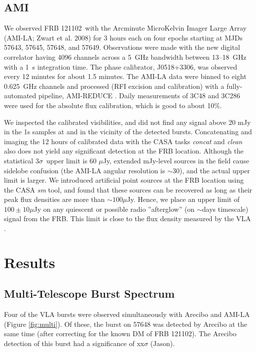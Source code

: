 \documentclass[twocolumn]{aastex61}
\newcommand{\frb}{FRB 121102}
\begin{document}
\subsection{AMI}

We observed \frb\ with the Arcminute MicroKelvin Imager Large Array (AMI-LA; Zwart et al. 2008) for 3 hours each on four epochs starting at MJDs 57643, 57645, 57648, and 57649. Observations were made with the new digital correlator having 4096 channels across a 5~GHz bandwidth between 13--18~GHz with a 1~s integration time. The phase calibrator, J0518+3306, was observed every 12 minutes for about 1.5 minutes. The AMI-LA data were binned to eight 0.625~GHz channels and processed (RFI excision and calibration) with a fully-automated pipeline, AMI-REDUCE \citep[e.g.,][]{2013MNRAS.429.3330P}. Daily measurements of 3C48 and 3C286 were used for the absolute flux calibration, which is good to about 10\%. 

We inspected the calibrated visibilities, and did not find any signal above 20 mJy in the 1s samples at and in the vicinity of the detected bursts. Concatenating and imaging the 12 hours of calibrated data with the CASA tasks {\it concat} and {\it clean} also does not yield any significant detection at the FRB location. Although the statistical $3\sigma$\ upper limit is 60 $\mu$Jy, extended mJy-level sources in the field cause sidelobe confusion (the AMI-LA angular resolution is $\sim$30\arcsec), and the actual upper limit is larger. We introduced artificial point sources at the FRB location using the CASA {\it sm} tool, and found that these sources can be recovered as long as their peak flux densities are more than $\sim100\mu$Jy. Hence, we place an upper limit of $100\pm10 \mu$Jy on any quiescent or possible radio ''afterglow'' (on $\sim$days timescale) signal from the FRB. This limit is close to the flux density measured by the VLA \citep{LOC}.

\section{Results}

\subsection{Multi-Telescope Burst Spectrum}
Four of the VLA bursts were observed simultaneously with Arecibo and AMI-LA (Figure \ref{fig:multi}). Of these, the burst on 57648 was detected by Arecibo at the same time (after correcting for the known DM of \frb). The Arecibo detection of this burst had a significance of {\color{red} xx$\sigma$ (Jason)}.
\end{document}

